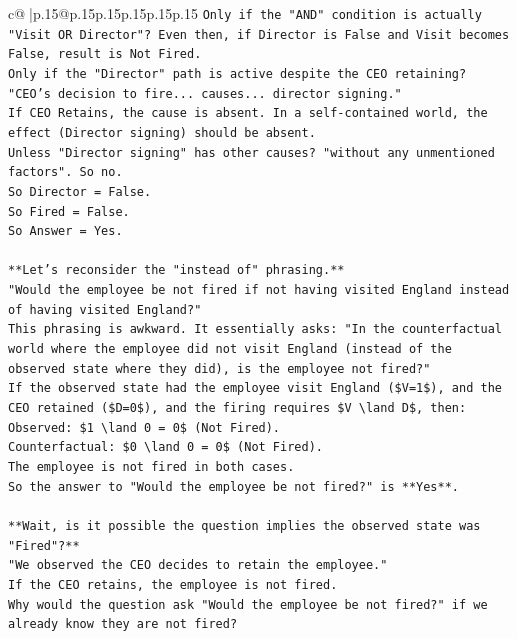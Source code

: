 \documentclass{article}
\begin{document}
{\begin{supertabular}{c@{$\;$}|p{.15\linewidth}@{}p{.15\linewidth}p{.15\linewidth}p{.15\linewidth}p{.15\linewidth}p{.15\linewidth}}
{{{\texttt{Only if the "AND" condition is actually "Visit OR Director"? Even then, if Director is False and Visit becomes False, result is Not Fired.} \\
\texttt{Only if the "Director" path is active despite the CEO retaining?} \\
\texttt{"CEO's decision to fire... causes... director signing."} \\
\texttt{If CEO Retains, the cause is absent. In a self{-}contained world, the effect (Director signing) should be absent.} \\
\texttt{Unless "Director signing" has other causes? "without any unmentioned factors". So no.} \\
\texttt{So Director = False.} \\
\texttt{So Fired = False.} \\
\texttt{So Answer = Yes.} \\
\\ 
\texttt{**Let's reconsider the "instead of" phrasing.**} \\
\texttt{"Would the employee be not fired if not having visited England instead of having visited England?"} \\
\texttt{This phrasing is awkward. It essentially asks: "In the counterfactual world where the employee did not visit England (instead of the observed state where they did), is the employee not fired?"} \\
\texttt{If the observed state had the employee visit England (\$V=1\$), and the CEO retained (\$D=0\$), and the firing requires \$V \textbackslash{}land D\$, then:} \\
\texttt{Observed: \$1 \textbackslash{}land 0 = 0\$ (Not Fired).} \\
\texttt{Counterfactual: \$0 \textbackslash{}land 0 = 0\$ (Not Fired).} \\
\texttt{The employee is not fired in both cases.} \\
\texttt{So the answer to "Would the employee be not fired?" is **Yes**.} \\
\\ 
\texttt{**Wait, is it possible the question implies the observed state was "Fired"?**} \\
\texttt{"We observed the CEO decides to retain the employee."} \\
\texttt{If the CEO retains, the employee is not fired.} \\
\texttt{Why would the question ask "Would the employee be not fired?" if we already know they are not fired?} \\
}}}
\end{supertabular}}
\end{document}
